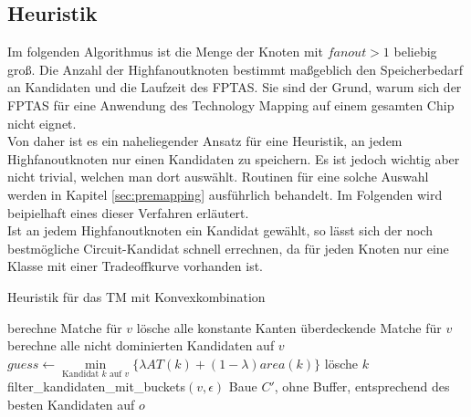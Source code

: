 \documentclass[11pt, a4paper, german]{article}
\newcommand{\TM}{Technology  Mapping }
\begin{document}
\subsection{Heuristik}
\label{subsec:heuristik}
Im folgenden Algorithmus ist die Menge der Knoten mit $fanout > 1$ beliebig groß.
Die Anzahl der Highfanoutknoten bestimmt maßgeblich den Speicherbedarf an Kandidaten und die Laufzeit des FPTAS. Sie sind der Grund, warum sich der FPTAS für eine Anwendung des \TM auf einem gesamten Chip nicht eignet. \\
Von daher ist es ein naheliegender Ansatz für eine Heuristik, an jedem Highfanoutknoten nur einen Kandidaten zu speichern. Es ist jedoch wichtig aber nicht trivial, welchen man dort auswählt. Routinen für eine solche Auswahl werden in Kapitel \ref{sec:premapping} ausführlich behandelt. Im Folgenden wird beipielhaft eines dieser Verfahren erläutert. \\
Ist an jedem Highfanoutknoten ein Kandidat gewählt, so lässt sich der noch bestmögliche Circuit-Kandidat schnell errechnen, da für jeden Knoten nur eine Klasse mit einer Tradeoffkurve vorhanden ist.\\
\begin{algorithm}[H]
 \LinesNumbered
 \DontPrintSemicolon
 \caption{Heuristik f\"ur das TM mit Konvexkombination}
 {
  berechne Matche für $v$\;
  lösche alle konstante Kanten überdeckende Matche für $v$\;
  berechne alle nicht dominierten Kandidaten auf $v$\;
  {
    $guess \gets \min\limits_{\text{Kandidat }k\text{ auf }v}\{ \lambda AT(k) + (1-\lambda) area(k)  \}$\;
    {
      {
	l\"osche $k$\;
      }
    }
  }
  filter\_kandidaten\_mit\_buckets$(v,\epsilon)$\;
 }
 Baue $C'$, ohne Buffer, entsprechend des besten Kandidaten auf $o$ \; 
\end{algorithm}\ \\
\end{document}
